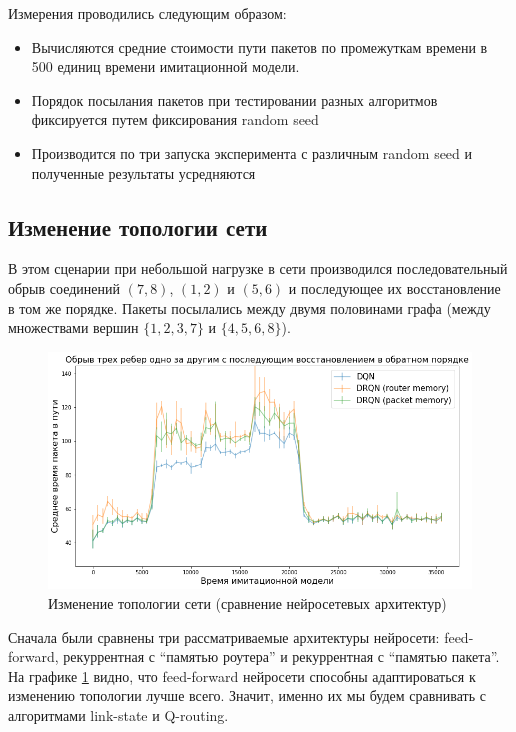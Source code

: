 \documentclass[specification, annotation]{itmo-student-thesis}
\begin{document}
Измерения проводились следующим образом:

\begin{itemize}
  \item Вычисляются средние стоимости пути пакетов по промежуткам времени в 500
    единиц времени имитационной модели.
  \item Порядок посылания пакетов при тестировании разных алгоритмов фиксируется
    путем фиксирования random seed
  \item Производится по три запуска эксперимента с различным random seed и
    полученные результаты усредняются
\end{itemize}

\subsection{Изменение топологии сети}\label{experiments:simple/links}

В этом сценарии при небольшой нагрузке в сети производился последовательный
обрыв соединений $(7, 8)$, $(1, 2)$ и $(5, 6)$ и последующее их восстановление в том
же порядке. Пакеты посылались между двумя половинами графа (между множествами
вершин $\{1, 2, 3, 7\}$ и $\{4, 5, 6, 8\}$).

\begin{figure}[!h]
  \caption{Изменение топологии сети (сравнение нейросетевых
    архитектур)}\label{experiment-link-failures-networks}
  \centering
  \includegraphics[scale=0.6]{experiment-link-failures-networks}
\end{figure}

Сначала были сравнены три рассматриваемые архитектуры нейросети: feed-forward,
рекуррентная с \enquote{памятью роутера} и рекуррентная с \enquote{памятью пакета}. На
графике \ref{experiment-link-failures-networks} видно, что feed-forward
нейросети способны адаптироваться к изменению топологии лучше всего. Значит,
именно их мы будем сравнивать с алгоритмами link-state и Q-routing.
\end{document}
